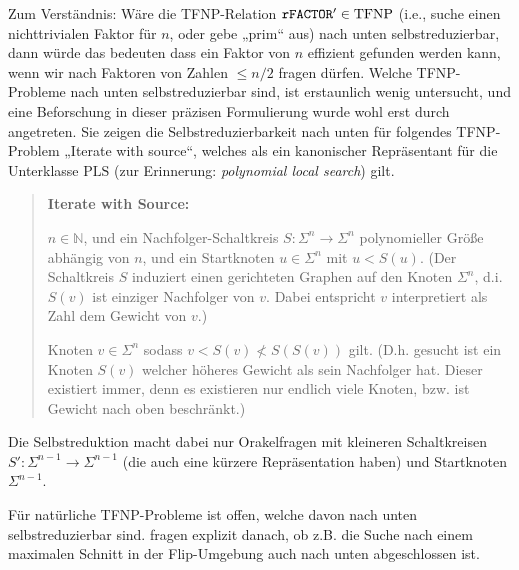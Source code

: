 Zum Verständnis: Wäre die TFNP-Relation $\mathtt{rFACTOR}'\in\mathrm{TFNP}$ (i.e., suche einen nichttrivialen Faktor für $n$, oder gebe „prim“ aus) nach unten selbstreduzierbar, dann würde das bedeuten dass ein Faktor von $n$ effizient gefunden werden kann, wenn wir nach Faktoren von Zahlen $\leq n/2$ fragen dürfen.
Welche TFNP-Probleme nach unten selbstreduzierbar sind, ist erstaunlich wenig untersucht, und eine Beforschung in dieser präzisen Formulierung wurde wohl erst durch \textcite{harsha_downward_2023} angetreten.
Sie zeigen die Selbstreduzierbarkeit nach unten für folgendes TFNP-Problem „Iterate with source“, welches als ein kanonischer Repräsentant für die Unterklasse $\mathrm{PLS}$ (zur Erinnerung: \emph{polynomial local search}) gilt.
\begin{quote}
    \textbf{Iterate with Source:}
    \begin{description}[nosep]
        \item[Gegeben:] $n\in\mathbb N$, und ein Nachfolger-Schaltkreis $S\colon\Sigma^n\to\Sigma^n$ polynomieller Größe abhängig von $n$, und ein Startknoten $u\in\Sigma^n$ mit $u<S(u)$. (Der Schaltkreis $S$ induziert einen gerichteten Graphen auf den Knoten $\Sigma^n$, d.i. $S(v)$ ist einziger Nachfolger von $v$. Dabei entspricht $v$ interpretiert als Zahl dem Gewicht von $v$.)
        \item[Gesucht:] Knoten $v\in\Sigma^n$ sodass $v<S(v)\not < S(S(v))$ gilt.
            (D.h. gesucht ist ein Knoten $S(v)$ welcher höheres Gewicht als sein Nachfolger hat. Dieser existiert immer, denn es existieren nur endlich viele Knoten, bzw. ist Gewicht nach oben beschränkt.)
    \end{description}
\end{quote}
Die Selbstreduktion macht dabei nur Orakelfragen mit kleineren Schaltkreisen $S'\colon\Sigma^{n-1}\to\Sigma^{n-1}$ (die auch eine kürzere Repräsentation haben) und Startknoten $\Sigma^{n-1}$.

Für natürliche  TFNP-Probleme ist offen, welche davon nach unten selbstreduzierbar sind. 
\citeauthor{harsha_downward_2023} fragen explizit danach, ob z.B. die Suche nach einem maximalen Schnitt in der Flip-Umgebung auch nach unten abgeschlossen ist.



